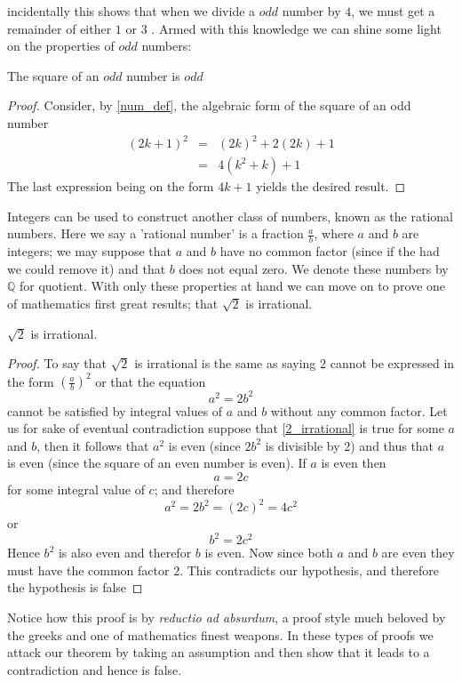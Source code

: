 incidentally this shows that when we divide a $odd$ number by $4$, we must get
a remainder of either $1$ or $3$ \label{remainder}. Armed with this knowledge
we can shine some light on the properties of $odd$ numbers:
\begin{corollary}
The square of an $odd$ number is $odd$
\end{corollary}
\begin{proof}
Consider, by \ref{num_def}, the algebraic form of the square of an odd number
\[
\begin{array}{lcl}
(2k+1)^2 & = & (2k)^2 + 2(2k) + 1 \\
                 & = & 4(k^2 + k) + 1
\end{array}
\]
The last expression being on the form $4k + 1$ yields the desired result.
\end{proof}

Integers can be used to construct another class of numbers, known as the rational numbers. Here we say a 'rational number' is a fraction $\frac{a}{b}$, where $a$ and $b$ are integers; we may suppose that $a$ and $b$ have no common factor (since if the had we could remove it) and that $b$ does not equal zero. We denote these numbers by $\mathbb{Q}$ for quotient. With only these properties at hand we can move on to prove one of mathematics first great results; that $\sqrt{2}$ is irrational.
\begin{proposition}
$\sqrt{2}$ is irrational.
\end{proposition}
\begin{proof}
To say that $\sqrt{2}$ is irrational is the same as saying $2$ cannot be expressed in the form $\left(\frac{a}{b}\right)^2$ or that the equation
\begin{equation}\label{2_irrational}
a^2 = 2b^2
\end{equation}
cannot be satisfied by integral values of $a$ and $b$ without any common factor. Let us for sake of eventual contradiction suppose that \ref{2_irrational} is true for some $a$ and $b$, then it follows that $a^2$ is even (since $2b^2$ is divisible by $2$) and thus that $a$ is even (since the square of an even number is even). If $a$ is even then
\[
a = 2c
\]
for some integral value of $c$; and therefore
\[
 a^2 = 2b^2 = (2c)^2 = 4c^2
\]
or
\[
b^2 = 2c^2
\]
Hence $b^2$ is also even and therefor $b$ is even. Now since both $a$ and $b$ are even they must have the common factor $2$. This contradicts our hypothesis, and therefore the hypothesis is false
\end{proof}
Notice how this proof is by \emph{reductio ad absurdum}, a proof style much beloved by the greeks and one of mathematics finest weapons. In these types of proofs we attack our theorem by taking an assumption and then show that it leads to a contradiction and hence is false.

